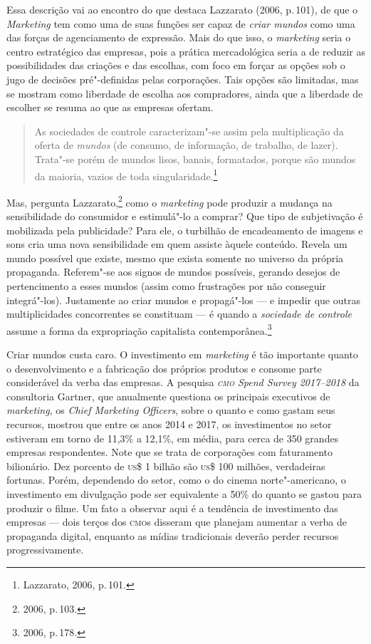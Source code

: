 Essa descrição vai ao encontro do que destaca Lazzarato (2006, p.\,101),
de que o \emph{Marketing} tem como uma de suas funções ser capaz de
\emph{criar mundos} como uma das forças de agenciamento de expressão.
Mais do que isso, o \emph{marketing} seria o centro estratégico das
empresas, pois a prática mercadológica seria a de reduzir as
possibilidades das criações e das escolhas, com foco em forçar as opções
sob o jugo de decisões pré"-definidas pelas corporações. Tais opções são
limitadas, mas se mostram como liberdade de escolha aos compradores, ainda que
a liberdade de escolher se resuma ao que as empresas ofertam.

\begin{quote}
As sociedades de controle caracterizam"-se assim pela multiplicação da
oferta de \emph{mundos} (de consumo, de informação, de trabalho, de lazer).
Trata"-se porém de mundos lisos, banais, formatados, porque são mundos da
maioria, vazios de toda singularidade.\footnote{Lazzarato, 2006, p.\,101.}
\end{quote}

Mas, pergunta Lazzarato,\footnote{2006, p.\,103.} como o \emph{marketing} pode
produzir a mudança na sensibilidade do consumidor e estimulá"-lo a
comprar? Que tipo de subjetivação é mobilizada pela publicidade? Para
ele, o turbilhão de encadeamento de imagens e sons cria uma nova
sensibilidade em quem assiste àquele conteúdo. Revela um mundo possível
que existe, mesmo que exista somente no universo da própria propaganda.
Referem"-se aos signos de mundos possíveis, gerando desejos de
pertencimento a esses mundos (assim como frustrações por não conseguir
integrá"-los). Justamente ao criar mundos e propagá"-los --- e impedir que
outras multiplicidades concorrentes se constituam --- é quando a
\emph{sociedade de controle} assume a forma da expropriação capitalista
contemporânea.\footnote{2006, p.\,178.}

Criar mundos custa caro. O investimento em \emph{marketing} é tão
importante quanto o desenvolvimento e a fabricação dos próprios produtos
e consome parte considerável da verba das empresas. A pesquisa \emph{\textsc{cmo}
Spend Survey 2017--2018} da consultoria Gartner, que anualmente questiona
os principais executivos de \emph{marketing}, os \emph{Chief Marketing
Officers}, sobre o quanto e como gastam seus recursos, mostrou que entre
os anos 2014 e 2017, os investimentos no setor estiveram em torno de
11,3\% a 12,1\%, em média, para cerca de 350 grandes empresas
respondentes. Note que se trata de corporações com faturamento
bilionário. Dez porcento de \textsc{us}\$ 1 bilhão são \textsc{us}\$ 100 milhões,
verdadeiras fortunas. Porém, dependendo do setor, como o do cinema
norte"-americano, o investimento em divulgação pode ser equivalente a
50\% do quanto se gastou para produzir o filme. Um fato a observar aqui
é a tendência de investimento das empresas --- dois terços dos \textsc{cmo}s
disseram que planejam aumentar a verba de propaganda digital, enquanto
as mídias tradicionais deverão perder recursos progressivamente.

